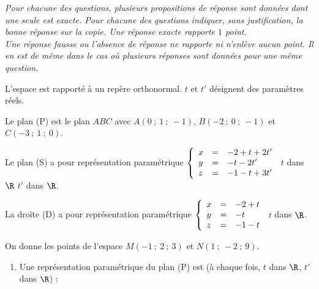 \documentclass{cornouaille}
\begin{document}
\begin{exercice}

  \emph{Pour chacune des questions, plusieurs propositions de réponse
    sont données dont une seule est exacte. Pour chacune des questions
    indiquer, sans justification, la bonne réponse sur la copie. Une
    réponse exacte rapporte $1$ point.\\ Une réponse fausse ou l'absence
    de réponse ne rapporte ni n'enlève aucun point. Il en est de même
    dans le cas où plusieurs réponses sont données pour une même
    question.}

  \medskip
 
  L'espace est rapporté à un repère orthonormal. $t$ et $t'$ désignent
  des paramètres réels.

  Le plan (P) est le plan $ABC$ avec $A(0~;~1~;~-1)$, $B(-2~;~0~;~-1)$
  et $C(-3~;~1~;~0)$.

  Le plan (S) a pour représentation paramétrique
  $\left\{\begin{array}{l c l}
            x&=&- 2 + t + 2t'\\
            y&=&- t - 2t'\\
            z&=&- 1 - t + 3t'
          \end{array}\right.$  $t$ dans $\R$ $t'$ dans $\R$.

        La droite (D) a pour représentation paramétrique
        $\left\{\begin{array}{l c l}
                  x&=&- 2 + t\\
                  y&=&- t \\
                  z&=&- 1 - t
                \end{array}\right.$ $t$ dans $\R$.
 
              On donne les points de l'espace $M(-1~;~2~;~3)$ et
              $N(1~;~-2~;~9)$.

              \medskip
 
              \begin{enumerate}
              \item Une représentation paramétrique du plan (P) est (à
                chaque fois, $t$ dans $\R$, $t'$ dans $\R$) :


\end{enumerate}
\end{exercice}
\end{document}
